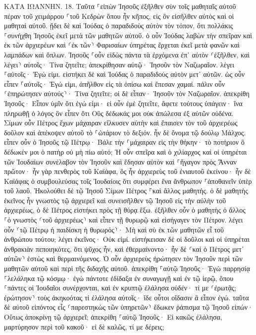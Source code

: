 \documentclass[twoside, 9pt]{extreport}
\begin{document}
ΚΑΤΑ ΙΩΑΝΝΗΝ.
18.
Ταῦτα ⸀εἰπὼν Ἰησοῦς ἐξῆλθεν σὺν τοῖς μαθηταῖς αὐτοῦ πέραν τοῦ χειμάρρου ⸀τοῦ Κεδρὼν ὅπου ἦν κῆπος, εἰς ὃν εἰσῆλθεν αὐτὸς καὶ οἱ μαθηταὶ αὐτοῦ. 
ᾔδει δὲ καὶ Ἰούδας ὁ παραδιδοὺς αὐτὸν τὸν τόπον, ὅτι πολλάκις ⸀συνήχθη Ἰησοῦς ἐκεῖ μετὰ τῶν μαθητῶν αὐτοῦ. 
ὁ οὖν Ἰούδας λαβὼν τὴν σπεῖραν καὶ ἐκ τῶν ἀρχιερέων καὶ ⸂ἐκ τῶν⸃ Φαρισαίων ὑπηρέτας ἔρχεται ἐκεῖ μετὰ φανῶν καὶ λαμπάδων καὶ ὅπλων. 
Ἰησοῦς ⸀οὖν εἰδὼς πάντα τὰ ἐρχόμενα ἐπ᾽ αὐτὸν ⸂ἐξῆλθεν, καὶ λέγει⸃ αὐτοῖς· Τίνα ζητεῖτε; 
ἀπεκρίθησαν αὐτῷ· Ἰησοῦν τὸν Ναζωραῖον. λέγει ⸀αὐτοῖς· Ἐγώ εἰμι. εἱστήκει δὲ καὶ Ἰούδας ὁ παραδιδοὺς αὐτὸν μετ᾽ αὐτῶν. 
ὡς οὖν εἶπεν ⸀αὐτοῖς· Ἐγώ εἰμι, ἀπῆλθον εἰς τὰ ὀπίσω καὶ ἔπεσαν χαμαί. 
πάλιν οὖν ⸂ἐπηρώτησεν αὐτούς⸃· Τίνα ζητεῖτε; οἱ δὲ εἶπαν· Ἰησοῦν τὸν Ναζωραῖον. 
ἀπεκρίθη Ἰησοῦς· Εἶπον ὑμῖν ὅτι ἐγώ εἰμι· εἰ οὖν ἐμὲ ζητεῖτε, ἄφετε τούτους ὑπάγειν· 
ἵνα πληρωθῇ ὁ λόγος ὃν εἶπεν ὅτι Οὓς δέδωκάς μοι οὐκ ἀπώλεσα ἐξ αὐτῶν οὐδένα. 
Σίμων οὖν Πέτρος ἔχων μάχαιραν εἵλκυσεν αὐτὴν καὶ ἔπαισεν τὸν τοῦ ἀρχιερέως δοῦλον καὶ ἀπέκοψεν αὐτοῦ τὸ ⸀ὠτάριον τὸ δεξιόν. ἦν δὲ ὄνομα τῷ δούλῳ Μάλχος. 
εἶπεν οὖν ὁ Ἰησοῦς τῷ Πέτρῳ· Βάλε τὴν ⸀μάχαιραν εἰς τὴν θήκην· τὸ ποτήριον ὃ δέδωκέν μοι ὁ πατὴρ οὐ μὴ πίω αὐτό; 
Ἡ οὖν σπεῖρα καὶ ὁ χιλίαρχος καὶ οἱ ὑπηρέται τῶν Ἰουδαίων συνέλαβον τὸν Ἰησοῦν καὶ ἔδησαν αὐτὸν 
καὶ ⸀ἤγαγον πρὸς Ἅνναν πρῶτον· ἦν γὰρ πενθερὸς τοῦ Καϊάφα, ὃς ἦν ἀρχιερεὺς τοῦ ἐνιαυτοῦ ἐκείνου· 
ἦν δὲ Καϊάφας ὁ συμβουλεύσας τοῖς Ἰουδαίοις ὅτι συμφέρει ἕνα ἄνθρωπον ⸀ἀποθανεῖν ὑπὲρ τοῦ λαοῦ. 
Ἠκολούθει δὲ τῷ Ἰησοῦ Σίμων Πέτρος ⸀καὶ ἄλλος μαθητής. ὁ δὲ μαθητὴς ἐκεῖνος ἦν γνωστὸς τῷ ἀρχιερεῖ καὶ συνεισῆλθεν τῷ Ἰησοῦ εἰς τὴν αὐλὴν τοῦ ἀρχιερέως, 
ὁ δὲ Πέτρος εἱστήκει πρὸς τῇ θύρᾳ ἔξω. ἐξῆλθεν οὖν ὁ μαθητὴς ὁ ἄλλος ⸀ὁ γνωστὸς ⸂τοῦ ἀρχιερέως⸃ καὶ εἶπεν τῇ θυρωρῷ καὶ εἰσήγαγεν τὸν Πέτρον. 
λέγει οὖν ⸂τῷ Πέτρῳ ἡ παιδίσκη ἡ θυρωρός⸃· Μὴ καὶ σὺ ἐκ τῶν μαθητῶν εἶ τοῦ ἀνθρώπου τούτου; λέγει ἐκεῖνος· Οὐκ εἰμί. 
εἱστήκεισαν δὲ οἱ δοῦλοι καὶ οἱ ὑπηρέται ἀνθρακιὰν πεποιηκότες, ὅτι ψῦχος ἦν, καὶ ἐθερμαίνοντο· ἦν δὲ ⸂καὶ ὁ Πέτρος μετ᾽ αὐτῶν⸃ ἑστὼς καὶ θερμαινόμενος. 
Ὁ οὖν ἀρχιερεὺς ἠρώτησεν τὸν Ἰησοῦν περὶ τῶν μαθητῶν αὐτοῦ καὶ περὶ τῆς διδαχῆς αὐτοῦ. 
ἀπεκρίθη ⸀αὐτῷ Ἰησοῦς· Ἐγὼ παρρησίᾳ ⸀λελάληκα τῷ κόσμῳ· ἐγὼ πάντοτε ἐδίδαξα ἐν συναγωγῇ καὶ ἐν τῷ ἱερῷ, ὅπου ⸀πάντες οἱ Ἰουδαῖοι συνέρχονται, καὶ ἐν κρυπτῷ ἐλάλησα οὐδέν· 
τί με ⸂ἐρωτᾷς; ἐρώτησον⸃ τοὺς ἀκηκοότας τί ἐλάλησα αὐτοῖς· ἴδε οὗτοι οἴδασιν ἃ εἶπον ἐγώ. 
ταῦτα δὲ αὐτοῦ εἰπόντος εἷς ⸂παρεστηκὼς τῶν ὑπηρετῶν⸃ ἔδωκεν ῥάπισμα τῷ Ἰησοῦ εἰπών· Οὕτως ἀποκρίνῃ τῷ ἀρχιερεῖ; 
ἀπεκρίθη ⸀αὐτῷ Ἰησοῦς· Εἰ κακῶς ἐλάλησα, μαρτύρησον περὶ τοῦ κακοῦ· εἰ δὲ καλῶς, τί με δέρεις; 
\end{document}
